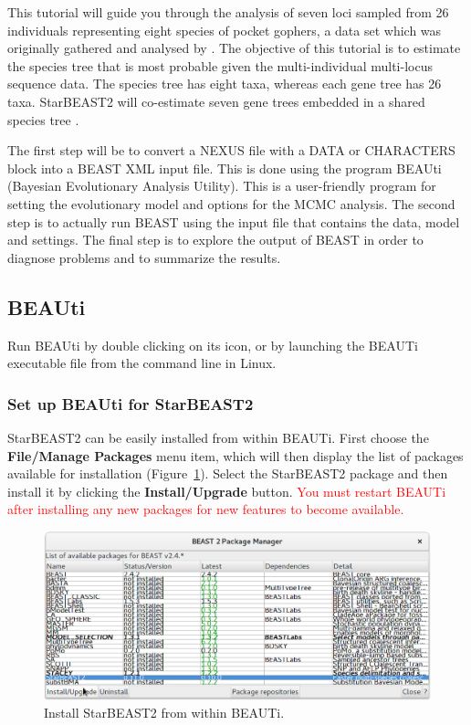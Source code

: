 \documentclass{article}
\begin{document}
This tutorial will guide you through the analysis of seven loci sampled from 26
individuals representing eight species of pocket gophers, a data set which was
originally gathered and analysed by
\cite{belfiore2008multilocus}. The objective of this tutorial is to estimate the
species tree that is most probable given the multi-individual multi-locus
sequence data. The species tree has eight taxa, whereas each gene tree has 26
taxa. StarBEAST2 will co-estimate seven gene trees embedded in a shared species
tree \citep{Heled01032010}.

The first step will be to convert a NEXUS file with a DATA or CHARACTERS block
into a BEAST XML input file. This is done using the program BEAUti (Bayesian
Evolutionary Analysis Utility). This is a user-friendly program for setting the
evolutionary model and options for the MCMC analysis. The second step is to
actually run BEAST using the input file that contains the data, model and
settings. The final step is to explore the output of BEAST in order to diagnose
problems and to summarize the results.

\subsection*{BEAUti}

Run BEAUti by double clicking on its icon, or by launching the BEAUTi executable
file from the command line in Linux.

\subsubsection*{Set up BEAUti for StarBEAST2}

StarBEAST2 can be easily installed from within BEAUTi. First choose the
\textbf{File/Manage Packages} menu item, which will then display the list of
packages available for installation (Figure~\ref{fig:managePackages}). Select
the StarBEAST2 package and then install it by clicking the
\textbf{Install/Upgrade} button. \textcolor{red}{You must restart BEAUTi after installing any new
packages for new features to become available.}

\begin{figure}[htb!]
\centering
\includegraphics[width=\textwidth]{figures/beauti-install.png}
\caption{Install StarBEAST2 from within BEAUTi.}
\label{fig:managePackages}
\end{figure}
\end{document}
